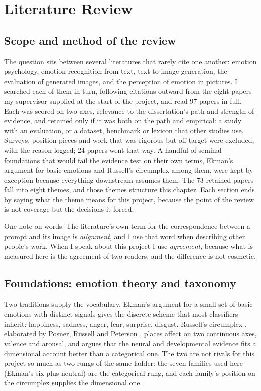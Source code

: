 \chapter{Literature Review}
\label{ch:lit}

\section{Scope and method of the review}
\label{sec:lit-scope}

The question sits between several literatures that rarely cite one another: emotion psychology, emotion recognition from text, text-to-image generation, the evaluation of generated images, and the perception of emotion in pictures. I searched each of them in turn, following citations outward from the eight papers my supervisor supplied at the start of the project, and read 97 papers in full. Each was scored on two axes, relevance to the dissertation's path and strength of evidence, and retained only if it was both on the path and empirical: a study with an evaluation, or a dataset, benchmark or lexicon that other studies use. Surveys, position pieces and work that was rigorous but off target were excluded, with the reason logged; 24 papers went that way. A handful of seminal foundations that would fail the evidence test on their own terms, Ekman's argument for basic emotions and Russell's circumplex among them, were kept by exception because everything downstream assumes them. The 73 retained papers fall into eight themes, and those themes structure this chapter. Each section ends by saying what the theme means for this project, because the point of the review is not coverage but the decisions it forced.

One note on words. The literature's own term for the correspondence between a prompt and its image is \emph{alignment}, and I use that word when describing other people's work. When I speak about this project I use \emph{agreement}, because what is measured here is the agreement of two readers, and the difference is not cosmetic.

\section{Foundations: emotion theory and taxonomy}
\label{sec:lit-theory}

Two traditions supply the vocabulary. Ekman's argument for a small set of basic emotions with distinct signals \cite{ekman1992argument} gives the discrete scheme that most classifiers inherit: happiness, sadness, anger, fear, surprise, disgust. Russell's circumplex \cite{russell1980circumplex}, elaborated by Posner, Russell and Peterson \cite{posner2005circumplex}, places affect on two continuous axes, valence and arousal, and argues that the neural and developmental evidence fits a dimensional account better than a categorical one. The two are not rivals for this project so much as two rungs of the same ladder: the seven families used here (Ekman's six plus neutral) are the categorical rung, and each family's position on the circumplex supplies the dimensional one.

